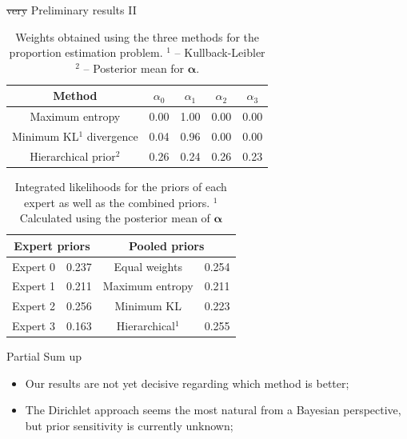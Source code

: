 \begin{frame}{\sout{very} Preliminary results II}
\begin{table}[ht]
\caption{Weights obtained using the three methods for the proportion estimation problem. $^1$ -- Kullback-Leibler $^2$ -- Posterior mean for $\boldsymbol\alpha$.}
\centering
\begin{tabular}{ccccc}
  \hline
Method  & $\alpha_0$ & $\alpha_1$ & $\alpha_2$ & $\alpha_3$ \\ 
  \hline
Maximum entropy & 0.00 & 1.00 & 0.00 & 0.00 \\ 
Minimum KL$^1$ divergence& 0.04 & 0.96 & 0.00 & 0.00 \\ 
Hierarchical prior$^2$ & 0.26 & 0.24 & 0.26 & 0.23 \\ 
   \hline
\end{tabular}
\end{table}
\begin{table}[ht]
\caption{Integrated likelihoods for the priors of each expert as well as the combined priors.
$^1$ Calculated using the posterior mean of $\boldsymbol\alpha$}
\centering
\begin{tabular}{cccc}
   \hline
   \multicolumn{2}{c}{Expert priors} &  \multicolumn{2}{c}{Pooled priors} \\
   \hline
   Expert 0 & 0.237 & Equal weights & 0.254\\
   Expert 1 & 0.211 & Maximum entropy & 0.211 \\
   Expert 2 & 0.256 & Minimum KL & 0.223\\ 
   Expert 3 & 0.163 & Hierarchical$^1$ & 0.255 \\
   \hline
\end{tabular}
\end{table}
\end{frame}
\begin{frame}{Partial Sum up}
\begin{itemize}
 \item Our results are not yet decisive regarding which method is better;
 \item The Dirichlet approach seems the most natural from a Bayesian perspective, but prior sensitivity is currently unknown;
\end{itemize}
\end{frame}

